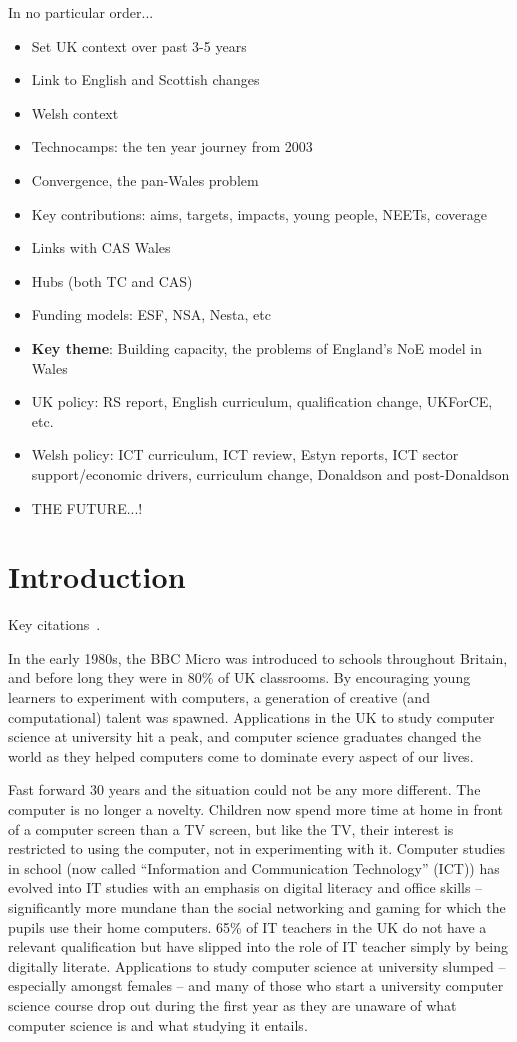 \documentclass{sig-alternate}
\begin{document}
In no particular order...

\begin{itemize}
\item Set UK context over past 3-5 years
\item Link to English and Scottish changes
\item Welsh context
\item Technocamps: the ten year journey from 2003
\item Convergence, the pan-Wales problem
\item Key contributions: aims, targets, impacts, young people, NEETs, coverage
\item Links with CAS Wales
\item Hubs (both TC and CAS)
\item Funding models: ESF, NSA, Nesta, etc
\item {\textbf{Key theme}}: Building capacity, the problems of
  England's NoE model in Wales
\item UK policy: RS report, English curriculum, qualification change,
  UKForCE, etc.
\item Welsh policy: ICT curriculum, ICT review, Estyn reports, ICT
  sector support/economic drivers, curriculum change,
  Donaldson and post-Donaldson
\item THE FUTURE...!
\end{itemize}


\section{Introduction}
Key citations~\cite{crick+sentance:2011,sentance-et-al-wipsce2012,brown-et-al-sigcse2012,brown-et-al-toce2014}.

In the early 1980s, the BBC Micro was introduced to schools throughout
Britain, and before long they were in 80\% of UK classrooms. By
encouraging young learners to experiment with computers, a generation
of creative (and computational) talent was spawned. Applications in
the UK to study computer science at university hit a peak, and
computer science graduates changed the world as they helped computers
come to dominate every aspect of our lives.

Fast forward 30 years and the situation could not be any more
different. The computer is no longer a novelty. Children now spend
more time at home in front of a computer screen than a TV screen, but
like the TV, their interest is restricted to using the computer, not
in experimenting with it. Computer studies in school (now called
``Information and Communication Technology'' (ICT)) has evolved into IT
studies with an emphasis on digital literacy and office skills --
significantly more mundane than the social networking and gaming for
which the pupils use their home computers. 65\% of IT teachers in the
UK do not have a relevant qualification but have slipped into the role
of IT teacher simply by being digitally literate. Applications to
study computer science at university slumped -- especially amongst
females -- and many of those who start a university computer science
course drop out during the first year as they are unaware of what
computer science is and what studying it entails.
\end{document}

